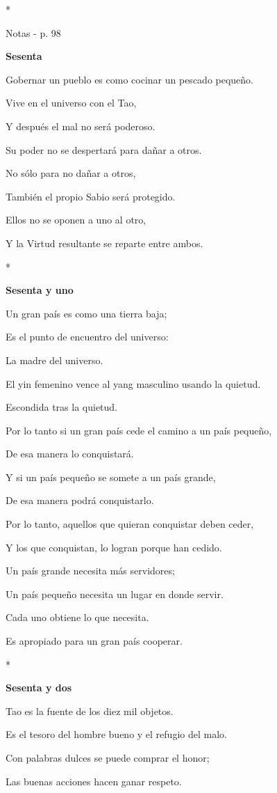 *

Notas - p. 98

\textbf{Sesenta}

Gobernar un pueblo es como cocinar un pescado pequeño.

Vive en el universo con el Tao,

Y después el mal no será poderoso.

Su poder no se despertará para dañar a otros.

No sólo para no dañar a otros,

También el propio Sabio será protegido.

Ellos no se oponen a uno al otro,

Y la Virtud resultante se reparte entre ambos.

*

\textbf{Sesenta y uno}

Un gran país es como una tierra baja;

Es el punto de encuentro del universo:

La madre del universo.

El yin femenino vence al yang masculino usando la quietud.

Escondida tras la quietud.

Por lo tanto si un gran país cede el camino a un país pequeño,

De esa manera lo conquistará.

Y si un país pequeño se somete a un país grande,

De esa manera podrá conquistarlo.

Por lo tanto, aquellos que quieran conquistar deben ceder,

Y los que conquistan, lo logran porque han cedido.

Un país grande necesita más servidores;

Un país pequeño necesita un lugar en donde servir.

Cada uno obtiene lo que necesita.

Es apropiado para un gran país cooperar.

*

\textbf{Sesenta y dos}

Tao es la fuente de los diez mil objetos.

Es el tesoro del hombre bueno y el refugio del malo.

Con palabras dulces se puede comprar el honor;

Las buenas acciones hacen ganar respeto.

